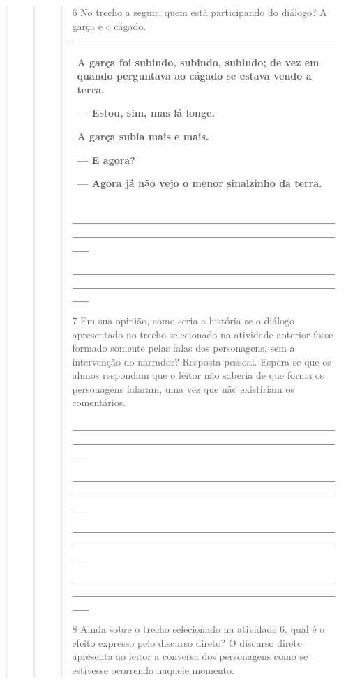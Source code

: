 \begin{quote}
\begin{quote}
\begin{quote}
\num{6} No trecho a seguir, quem está participando do diálogo? A garça e o
cágado.

\begin{longtable}[]{@{}l@{}}
\toprule
\begin{minipage}[t]{0.97\columnwidth}\raggedright\strut
A garça foi subindo, subindo, subindo; de vez em quando perguntava ao
cágado se estava vendo a terra.

--- Estou, sim, mas lá longe.

A garça subia mais e mais.

--- E agora?

--- Agora já não vejo o menor sinalzinho da terra.\strut
\end{minipage}\tabularnewline
\bottomrule
\end{longtable}

\protect\hypertarget{_Hlk127806075}{}{}\textbf{\_\_\_\_\_\_\_\_\_\_\_\_\_\_\_\_\_\_\_\_\_\_\_\_\_\_\_\_\_\_\_\_\_\_\_\_\_\_\_\_\_\_\_\_\_\_\_\_\_\_\_\_\_\_\_\_\_\_\_\_\_\_\_\_}

\textbf{\_\_\_\_\_\_\_\_\_\_\_\_\_\_\_\_\_\_\_\_\_\_\_\_\_\_\_\_\_\_\_\_\_\_\_\_\_\_\_\_\_\_\_\_\_\_\_\_\_\_\_\_\_\_\_\_\_\_\_\_\_\_\_\_}

\num{7} Em sua opinião, como seria a história se o diálogo apresentado no trecho selecionado na atividade anterior fosse formado
somente pelas falas dos personagens, sem a intervenção do narrador?
Resposta pessoal. Espera-se que os alunos respondam que o leitor não
saberia de que forma os personagens falaram, uma vez que não existiriam
os comentários.

\textbf{\_\_\_\_\_\_\_\_\_\_\_\_\_\_\_\_\_\_\_\_\_\_\_\_\_\_\_\_\_\_\_\_\_\_\_\_\_\_\_\_\_\_\_\_\_\_\_\_\_\_\_\_\_\_\_\_\_\_\_\_\_\_\_\_}

\textbf{\_\_\_\_\_\_\_\_\_\_\_\_\_\_\_\_\_\_\_\_\_\_\_\_\_\_\_\_\_\_\_\_\_\_\_\_\_\_\_\_\_\_\_\_\_\_\_\_\_\_\_\_\_\_\_\_\_\_\_\_\_\_\_\_}

\textbf{\_\_\_\_\_\_\_\_\_\_\_\_\_\_\_\_\_\_\_\_\_\_\_\_\_\_\_\_\_\_\_\_\_\_\_\_\_\_\_\_\_\_\_\_\_\_\_\_\_\_\_\_\_\_\_\_\_\_\_\_\_\_\_\_}

\textbf{\_\_\_\_\_\_\_\_\_\_\_\_\_\_\_\_\_\_\_\_\_\_\_\_\_\_\_\_\_\_\_\_\_\_\_\_\_\_\_\_\_\_\_\_\_\_\_\_\_\_\_\_\_\_\_\_\_\_\_\_\_\_\_\_}

\num{8} Ainda sobre o trecho selecionado na atividade 6, qual é o efeito expresso pelo discurso direto? O discurso
direto apresenta ao leitor a conversa dos personagens como se estivesse
ocorrendo naquele momento.


\end{quote}
\end{quote}
\end{quote}
